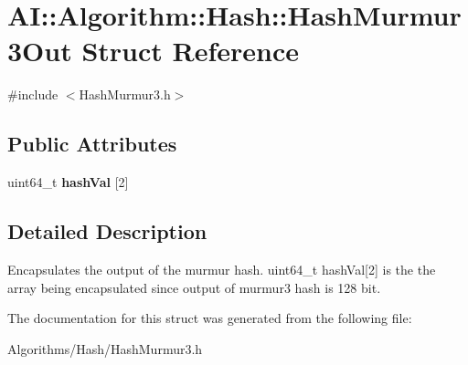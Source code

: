 \hypertarget{structAI_1_1Algorithm_1_1Hash_1_1HashMurmur3Out}{\section{A\-I\-:\-:Algorithm\-:\-:Hash\-:\-:Hash\-Murmur3\-Out Struct Reference}
\label{structAI_1_1Algorithm_1_1Hash_1_1HashMurmur3Out}
}


{\ttfamily \#include $<$Hash\-Murmur3.\-h$>$}

\subsection*{Public Attributes}
\begin{DoxyCompactItemize}
\item 
\hypertarget{structAI_1_1Algorithm_1_1Hash_1_1HashMurmur3Out_a181dd4bb7df2d2c722d4bfa8d88f2c0d}{uint64\-\_\-t {\bfseries hash\-Val} \mbox{[}2\mbox{]}}\label{structAI_1_1Algorithm_1_1Hash_1_1HashMurmur3Out_a181dd4bb7df2d2c722d4bfa8d88f2c0d}

\end{DoxyCompactItemize}


\subsection{Detailed Description}
Encapsulates the output of the murmur hash. uint64\-\_\-t hash\-Val\mbox{[}2\mbox{]} is the the array being encapsulated since output of murmur3 hash is 128 bit. 

The documentation for this struct was generated from the following file\-:\begin{DoxyCompactItemize}
\item 
Algorithms/\-Hash/Hash\-Murmur3.\-h\end{DoxyCompactItemize}
